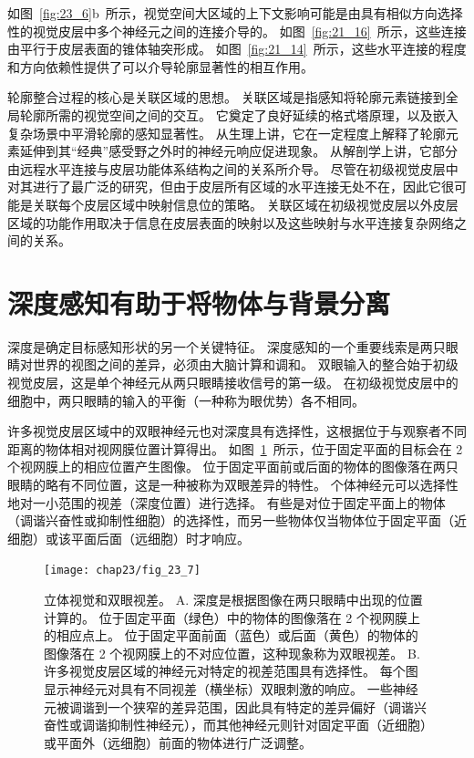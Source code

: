 如图~\ref{fig:23_6}b~所示，视觉空间大区域的上下文影响可能是由具有相似方向选择性的视觉皮层中多个神经元之间的连接介导的。
如图~\ref{fig:21_16}~所示，这些连接由平行于皮层表面的锥体轴突形成。
如图~\ref{fig:21_14}~所示，这些水平连接的程度和方向依赖性提供了可以介导轮廓显著性的相互作用。


轮廓整合过程的核心是关联区域的思想。
关联区域是指感知将轮廓元素链接到全局轮廓所需的视觉空间之间的交互。
它奠定了良好延续的格式塔原理，以及嵌入复杂场景中平滑轮廓的感知显著性。
从生理上讲，它在一定程度上解释了轮廓元素延伸到其“经典”感受野之外时的神经元响应促进现象。
从解剖学上讲，它部分由远程水平连接与皮层功能体系结构之间的关系所介导。
尽管在初级视觉皮层中对其进行了最广泛的研究，但由于皮层所有区域的水平连接无处不在，因此它很可能是关联每个皮层区域中映射信息位的策略。
关联区域在初级视觉皮层以外皮层区域的功能作用取决于信息在皮层表面的映射以及这些映射与水平连接复杂网络之间的关系。



\section{深度感知有助于将物体与背景分离}

深度是确定目标感知形状的另一个关键特征。
深度感知的一个重要线索是两只眼睛对世界的视图之间的差异，必须由大脑计算和调和。
双眼输入的整合始于初级视觉皮层，这是单个神经元从两只眼睛接收信号的第一级。
在初级视觉皮层中的细胞中，两只眼睛的输入的平衡（一种称为眼优势）各不相同。


许多视觉皮层区域中的双眼神经元也对深度具有选择性，这根据位于与观察者不同距离的物体相对视网膜位置计算得出。
如图~\ref{fig:23_7}~所示，位于固定平面的目标会在 2 个视网膜上的相应位置产生图像。
位于固定平面前或后面的物体的图像落在两只眼睛的略有不同位置，这是一种被称为双眼差异的特性。
个体神经元可以选择性地对一小范围的视差（深度位置）进行选择。
有些是对位于固定平面上的物体（调谐兴奋性或抑制性细胞）的选择性，而另一些物体仅当物体位于固定平面（近细胞）或该平面后面（远细胞）时才响应。


\begin{figure}[htbp]
	\centering
	\texttt{[image: chap23/fig\_23\_7]}
	\caption{立体视觉和双眼视差。
		A. 深度是根据图像在两只眼睛中出现的位置计算的。
		位于固定平面（绿色）中的物体的图像落在 2 个视网膜上的相应点上。
		位于固定平面前面（蓝色）或后面（黄色）的物体的图像落在 2 个视网膜上的不对应位置，这种现象称为双眼视差。
		B. 许多视觉皮层区域的神经元对特定的视差范围具有选择性。
		每个图显示神经元对具有不同视差（横坐标）双眼刺激的响应。
		一些神经元被调谐到一个狭窄的差异范围，因此具有特定的差异偏好（调谐兴奋性或调谐抑制性神经元），而其他神经元则针对固定平面（近细胞）或平面外（远细胞）前面的物体进行广泛调整\cite{poggio1995mechanisms}。}
	\label{fig:23_7}
\end{figure}



